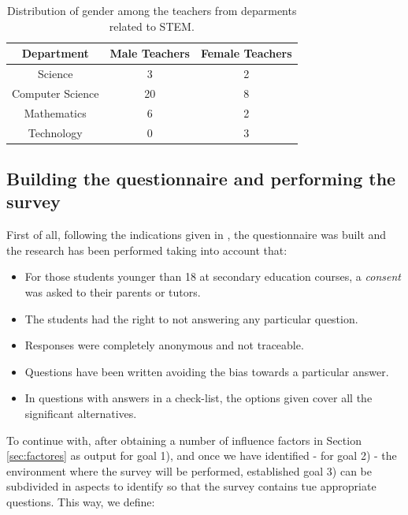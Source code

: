 \documentclass[journal,transmag]{IEEEtran}
\begin{document}
\begin{table}
	\caption[Teachers in STEM departments]{Distribution of gender among the teachers from deparments related to STEM.}
	\label{tab:teachers}
	
	\begin{center}
		\begin{tabular}{|c|c|c|}
			\hline
			\textbf{Department} & \textbf{Male Teachers} & \textbf{Female Teachers} \\ \hline
			Science & 3 & 2 \\ \hline
			Computer Science & 20 & 8 \\ \hline
			Mathematics & 6 & 2 \\ \hline
			Technology & 0 & 3 \\
			\hline
		\end{tabular}
	\end{center}
\end{table}

\subsection{Building the questionnaire and performing the survey}

First of all, following the indications given in \cite{cohen2013research}, the questionnaire was built and the research has been performed taking into account that:

\begin{itemize}
  \item For those students younger than 18 at secondary education courses, a \textit{consent} was asked to their parents or tutors.
  \item The students had the right to not answering any particular question.
  \item Responses were completely anonymous and not traceable.
  \item Questions have been written avoiding the bias towards a particular answer.
  \item In questions with answers in a check-list, the options given cover all the significant alternatives.
\end{itemize}

To continue with, after obtaining a number of influence factors in Section \ref{sec:factores} as output for goal 1), and once we have identified - for goal 2) - the environment where the survey will be performed, established goal 3) can be subdivided in aspects to identify so that the survey contains tue appropriate questions. This way, we define:
\end{document}
